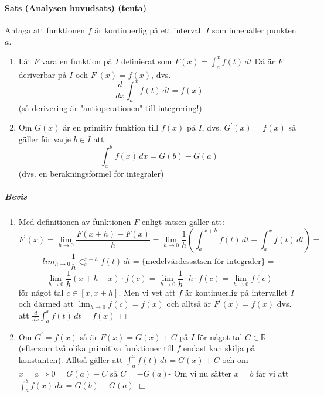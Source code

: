 \paragraph*{Sats (Analysen huvudsats) (tenta)}
Antaga att funktionen $f$ är kontinuerlig på ett intervall $I$ som innehåller punkten $a$.
\begin{enumerate}
    \item Låt $F$ vara en funktion på $I$ definierat som $F(x)=\int_a^xf(t)\, dt$
          Då är $F$ deriverbar på $I$ och $F^\prime(x)=f(x)$, dvs.
          \begin{equation*}
              \frac{d}{dx}\int_a^x f(t)\,dt=f(x)
          \end{equation*}
          (så derivering är "antioperationen" till integrering!)
    \item Om $G(x)$ är en primitiv funktion till $f(x)$ på $I$,
          dvs. $G^\prime(x)=f(x)$ så gäller för varje $b\in I$ att:
          \begin{equation*}
              \int_a^b f(x)\,dx=G(b)-G(a)
          \end{equation*}
          (dvs. en beräkningsformel för integraler)
\end{enumerate}
\subparagraph{Bevis}

\begin{enumerate}
    \item Med definitionen av funktionen $F$ enligt satsen gäller att:
          \begin{equation*}
              F^\prime(x)=\lim_{h\to 0}\frac{F(x+h)-F(x)}{h}=
              \lim_{h\to 0}\frac{1}{h}(\int_a^{x+h}f(t)\, dt - \int_a^x f(t)\, dt)=
          \end{equation*}
          \begin{equation*}
              lim_{h\to 0}\frac{1}{h}\in_x^{x+h} f(t)\, dt=
              \{\text{medelvärdessatsen för integraler}\}=
          \end{equation*}
          \begin{equation*}
              \lim_{h\to 0}\frac{1}{h}(x+h-x)\cdot f(c)=
              \lim_{h\to 0}\frac{1}{h}\cdot h\cdot f(c)=\lim_{h\to 0}f(c)
          \end{equation*}
          för något tal $c\in[x,x+h]$.
          Men vi vet att $f$ är kontinuerlig på intervallet $I$ och
          därmed att $\lim_{h\to 0}f(c)=f(x)$ och alltså är
          $F^\prime(x)=f(x)$ dvs. att $\frac{d}{dx}\int_a^xf(t)\, dt= f(x)$ $\Box$
    \item Om $G^\prime = f(x)$ så är $F(x)=G(x)+C$ på $I$ för något tal
          $C\in\mathbb{R}$ (eftersom två olika primitiva funktioner till
          $f$ endast kan skilja på konstanten).
          Alltså gäller att $\int_a^x f(t)\, dt=G(x)+C$ och om $x=a\Rightarrow 0=G(a)-C$ så $C=-G(a)$-
          Om vi nu sätter $x=b$ får vi att $\int_a^b f(x)\, dx=G(b)-G(a)$ $\Box$
\end{enumerate}

